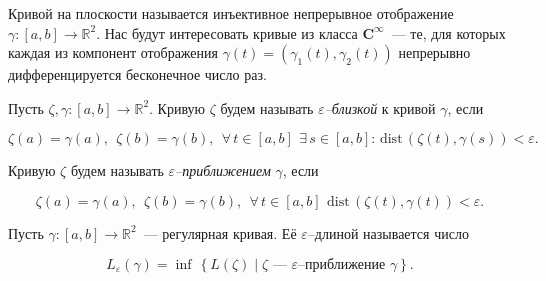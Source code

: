 
\def\dist{\mathrm{dist}\,} \def\ve{\varepsilon}

\noindent Кривой на плоскости называется инъективное непрерывное отображение $\gamma \colon [a,b] \rightarrow {\mathbb R}^2$. Нас будут интересовать кривые из класса $\mathbf C^\infty$~--- те, для которых каждая из компонент отображения $\gamma(t) = (\gamma_1 (t), \gamma_2 (t))$ непрерывно дифференцируется бесконечное число раз.

\medskip\par\noindent Пусть $\zeta, \gamma \colon [a,b] \longrightarrow {\mathbb R}^2$. Кривую $\zeta$ будем называть {\itshape $\varepsilon$--близкой} к кривой $\gamma$, если

\vspace{-0.2cm}
$$ \zeta(a) = \gamma(a),\ \ \zeta(b) = \gamma(b),\ \ 
\forall\,t \in [a,b]\ \,\exists\,s \in [a,b] \colon
\,\dist(\zeta(t), \gamma(s)) < \varepsilon.$$
\vspace{-0.4cm}

\medskip\par\noindent  Кривую $\zeta$ будем называть {\itshape $\varepsilon$--приближением} $\gamma$, если

\vspace{-0.2cm}
$$ \zeta(a) = \gamma(a),\ \ \zeta(b) = \gamma(b),\ \ 
\forall\,t \in [a,b]\ \,\dist(\zeta(t), \gamma(t)) < \varepsilon.$$
\vspace{-0.4cm}

\medskip\par\noindent  Пусть $\gamma \colon [a,b] \rightarrow {\mathbb R}^2$~--- регулярная кривая. Её $\varepsilon$--длиной называется число

\vspace{-0.2cm}
$$L_\varepsilon (\gamma) =
\inf \,\left\{
	L(\zeta)  \mid  \text{$\zeta$~--- $\varepsilon$--приближение $\gamma$}
\right\}.$$
\vspace{-0.65cm}

